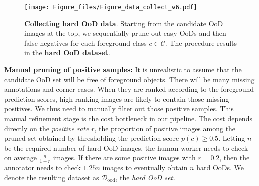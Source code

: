\documentclass[10pt,twocolumn,letterpaper]{article}
\begin{document}
\begin{figure}[t]
\centering
\texttt{[image: Figure\_files/Figure\_data\_collect\_v6.pdf]}
\vspace{-2em}
\caption{\label{data_collect} \textbf{Collecting hard OoD data}. Starting from the candidate OoD images at the top, we sequentially prune out easy OoDs and then false negatives for each foreground class $c\in\mathcal{C}$. The procedure results in the \textbf{hard OoD dataset}.}
\vspace{-1em}
\end{figure}
 
\textbf{Manual pruning of positive samples:}
It is unrealistic to assume that the candidate OoD set will be free of foreground objects. There will be many missing annotations and corner cases. When they are ranked according to the foreground prediction scores, high-ranking images are likely to contain those missing positives. 
We thus need to manually filter out those positive samples.
This manual refinement stage is the cost bottleneck in our pipeline.
The cost depends directly on the \textit{positive rate} $r$, the proportion of positive images among the pruned set obtained by thresholding the prediction score $p(c)\geq 0.5$. 
Letting $n$ be the required number of hard OoD images, the human worker needs to check on average $\frac{n}{1-r}$ images. If there are some positive images with \eg $r=0.2$, then the annotator needs to check $1.25n$ images to eventually obtain $n$ hard OoDs. We denote the resulting dataset as $\mathcal{D}_{\text{ood}}$, the \textit{hard OoD set}.
\end{document}
